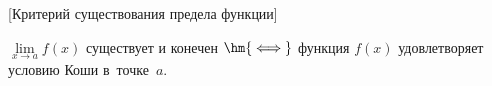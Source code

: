 [Критерий существования предела функции] \label{KKoshi}
    

    $\lim\limits_{x\to a} f(x)$ существует и конечен $\hm{\iff}$ функция $f(x)$ удовлетворяет условию Коши в~точке~$a$.
